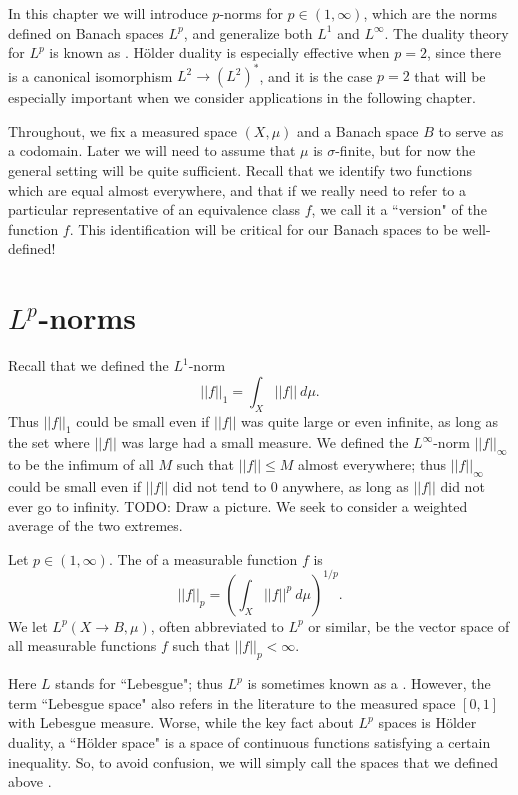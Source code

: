 In this chapter we will introduce $p$-norms for $p \in (1, \infty)$, which are the norms defined on Banach spaces $L^p$, and generalize both $L^1$ and $L^\infty$.
The duality theory for $L^p$ is known as .
H\"older duality is especially effective when $p = 2$, since there is a canonical isomorphism $L^2 \to (L^2)^*$, and it is the case $p = 2$ that will be especially important when we consider applications in the following chapter.

Throughout, we fix a measured space $(X, \mu)$ and a Banach space $B$ to serve as a codomain.
Later we will need to assume that $\mu$ is $\sigma$-finite, but for now the general setting will be quite sufficient.
Recall that we identify two functions which are equal almost everywhere, and that if we really need to refer to a particular representative of an equivalence class $f$, we call it a ``version" of the function $f$.
This identification will be critical for our Banach spaces to be well-defined!

\section{$L^p$-norms}
Recall that we defined the $L^1$-norm
\[||f||_1 = \int_X ||f||~d\mu.\]
Thus $||f||_1$ could be small even if $||f||$ was quite large or even infinite, as long as the set where $||f||$ was large had a small measure.
We defined the $L^\infty$-norm $||f||_\infty$ to be the infimum of all $M$ such that $||f|| \leq M$ almost everywhere; thus $||f||_\infty$ could be small even if $||f||$ did not tend to $0$ anywhere, as long as $||f||$ did not ever go to infinity.
TODO: Draw a picture.
We seek to consider a weighted average of the two extremes.

\begin{definition}
Let $p \in (1, \infty)$.
The  of a measurable function $f$ is
\begin{equation}
\label{Lp definition}
||f||_p = \left(\int_X ||f||^p ~d\mu\right)^{1/p}.
\end{equation}
We let $L^p(X \to B, \mu)$, often abbreviated to $L^p$ or similar, be the vector space of all measurable functions $f$ such that $||f||_p < \infty$.
\end{definition}

Here $L$ stands for ``Lebesgue"; thus $L^p$ is sometimes known as a .
However, the term ``Lebesgue space" also refers in the literature to the measured space $[0, 1]$ with Lebesgue measure.
Worse, while the key fact about $L^p$ spaces is H\"older duality, a ``H\"older space" is a space of continuous functions satisfying a certain inequality.
So, to avoid confusion, we will simply call the spaces that we defined above .

